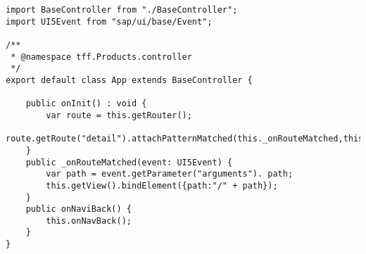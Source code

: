 \begin{mdframed}[backgroundcolor=mygrey2, leftmargin=0.5cm, hidealllines=true, innerleftmargin=3pt, innerrightmargin=0cm, innertopmargin=0cm, innerbottommargin=-3cm, splitbottomskip=0]
\begin{lstlisting}[emph={event, UI5Event, listItem, detail, path}, caption=Detail Controller der Anwendung]
import BaseController from "./BaseController";
import UI5Event from "sap/ui/base/Event";

/**
 * @namespace tff.Products.controller
 */
export default class App extends BaseController {

	public onInit() : void {
		var route = this.getRouter();
		route.getRoute("detail").attachPatternMatched(this._onRouteMatched,this);
	}
	public _onRouteMatched(event: UI5Event) {
		var path = event.getParameter("arguments"). path;
		this.getView().bindElement({path:"/" + path});
	}
	public onNaviBack() {
		this.onNavBack();
	}
}
\end{lstlisting}
\end{mdframed}

